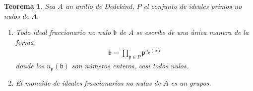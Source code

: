 \documentclass[oneside,bibtotoc,leqno,spanish]{amsbook}
\newcommand{\idl}[1]{\mathfrak{#1}}
\numberwithin{equation}{section}
\theoremstyle{defi}
\theoremstyle{note}
\newtheorem{theorem}{Teorema}
\theoremstyle{rem}
\numberwithin{theorem}{section}
\numberwithin{proposition}{section}
\numberwithin{definition}{section}
\numberwithin{lemma}{section}
\numberwithin{corollary}{section}
\numberwithin{example}{section}
\numberwithin{footnote}{section}%
\begin{document}
\begin{theorem}\label{teo3.4.3}
Sea $A$ un anillo de Dedekind, $P$ el conjunto de ideales primos no nulos de $A$.
\begin{enumerate}
\item Todo ideal fraccionario no nulo $\idl{b}$ de $A$ se escribe de una \'unica manera de la forma
\begin{gather}\label{eq-3.4-4}
\idl{b} = \prod_{\idl{p}\in P}\idl{p}^{n_{\idl{p}}(\idl{b})}
\end{gather}
donde los $n_{\idl{p}}(\idl{b})$ son n\'umeros enteros, casi todos nulos.
\item El monoide de ideales fraccionarios no nulos de $A$ es un grupos.
\end{enumerate}
\end{theorem}
\end{document}
